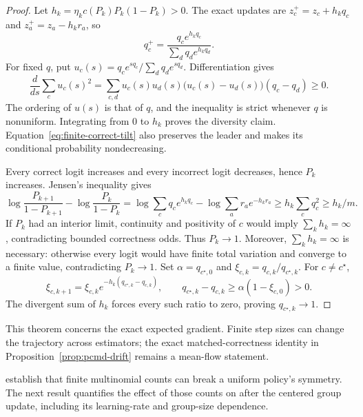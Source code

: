 \begin{proof}
\enforcehalffinalproseline
Let $h_k=\eta_kc(P_k)P_k(1-P_k)>0$. The exact updates are
$z_c^+=z_c+h_kq_c$ and $z_a^+=z_a-h_kr_a$, so
\begin{equation}
 q_c^+=\frac{q_c e^{h_kq_c}}{\sum_dq_d e^{h_kq_d}}.
 \label{eq:finite-correct-tilt}
\end{equation}
For fixed $q$, put $u_c(s)=q_ce^{sq_c}/\sum_dq_de^{sq_d}$.
Differentiation gives
\[
 \frac{d}{ds}\sum_cu_c(s)^2
 =\sum_{c,d}u_c(s)u_d(s)
       \big(u_c(s)-u_d(s)\big)(q_c-q_d)\ge0.
\]
The ordering of $u(s)$ is that of $q$, and the inequality is strict whenever
$q$ is nonuniform. Integrating from $0$ to $h_k$ proves the diversity claim.
Equation~\eqref{eq:finite-correct-tilt} also preserves the leader and makes
its conditional probability nondecreasing.

Every correct logit increases and every incorrect logit decreases, hence
$P_k$ increases. Jensen's inequality gives
\[
 \log\frac{P_{k+1}}{1-P_{k+1}}-\log\frac{P_k}{1-P_k}
 =\log\sum_cq_c e^{h_kq_c}-\log\sum_ar_a e^{-h_kr_a}
 \ge h_k\sum_cq_c^2\ge h_k/m.
\]
If $P_k$ had an interior limit, continuity and positivity of $c$ would imply
$\sum_kh_k=\infty$, contradicting bounded correctness odds. Thus $P_k\to1$.
Moreover, $\sum_kh_k=\infty$ is necessary: otherwise every logit would have
finite total variation and converge to a finite value, contradicting
$P_k\to1$.
Set $\alpha=q_{c^\star,0}$ and
$\xi_{c,k}=q_{c,k}/q_{c^\star,k}$. For $c\ne c^\star$,
\[
 \xi_{c,k+1}=\xi_{c,k}
  e^{-h_k(q_{c^\star,k}-q_{c,k})},
 \qquad
 q_{c^\star,k}-q_{c,k}
 \ge\alpha(1-\xi_{c,0})>0.
\]
The divergent sum of $h_k$ forces every such ratio to zero, proving
$q_{c^\star,k}\to1$.
\end{proof}

This theorem concerns the exact expected gradient. Finite step sizes can
change the trajectory across estimators; the exact matched-correctness
identity in Proposition~\ref{prop:pcmd-drift} remains a mean-flow statement.

\citet[Proposition~A.1]{lochab2026ucpo} establish that finite multinomial
counts can break a uniform policy's symmetry. The next result quantifies
the effect of those counts on \pmd{} after the centered group update,
including its learning-rate and group-size dependence.

